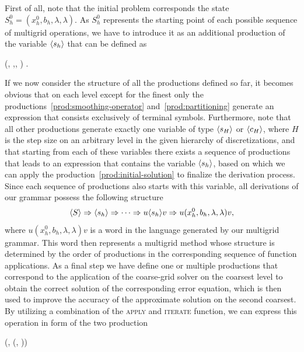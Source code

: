 First of all, note that the initial problem corresponds the state $S_h^0 = (x_h^0, b_h, \lambda, \lambda)$.
As $S_h^0$ represents the starting point of each possible sequence of multigrid operations, we have to introduce it as an additional production of the variable $\langle s_h \rangle$ that can be defined as
\begin{bnf}
	 {
	 (, \bnfsp {},\bnfsp \bnfes, \bnfsp \bnfes)
	}.
\label{prod:initial-solution}
\end{bnf} 
If we now consider the structure of all the productions defined so far, it becomes obvious that on each level except for the finest only the productions~\eqref{prod:smoothing-operator} and~\eqref{prod:partitioning} generate an expression that consists exclusively of terminal symbols.
Furthermore, note that all other productions generate exactly one variable of type $\langle s_H \rangle$ or $\langle c_H \rangle$, where $H$ is the step size on an arbitrary level in the given hierarchy of discretizations, and that starting from each of these variables there exists a sequence of productions that leads to an expression that contains the variable $\langle s_h \rangle$, based on which we can apply the production~\eqref{prod:initial-solution} to finalize the derivation process.
Since each sequence of productions also starts with this variable, all derivations of our grammar possess the following structure
\setcounter{equation}{116}
\begin{equation}
	\langle S \rangle \Rightarrow \langle s_h \rangle \Rightarrow \dots \Rightarrow u \langle s_h \rangle v \Rightarrow u (x_h^0, b_h, \lambda, \lambda) v,
	\label{eq:multigrid-grammar-derivation}
\end{equation}
\setcounter{equation}{12}
where $u (x_h^0, b_h, \lambda, \lambda) v$ is a word in the language generated by our multigrid grammar.
This word then represents a multigrid method whose structure is determined by the order of productions in the corresponding sequence of function applications.
As a final step we have define one or multiple productions that correspond to the application of the coarse-grid solver on the coarsest level to obtain the correct solution of the corresponding error equation, which is then used to improve the accuracy of the approximate solution on the second coarsest.
By utilizing a combination of the \textsc{apply} and \textsc{iterate} function, we can express this operation in form of the two production
\begin{bnf}
	 {
		(, \bnfsp {}(, \bnfsp{}))
	} 	\label{prod:coarse-grid-solver} \\
	 	\label{prod:coarse-grid-solver-correction}
\end{bnf}
